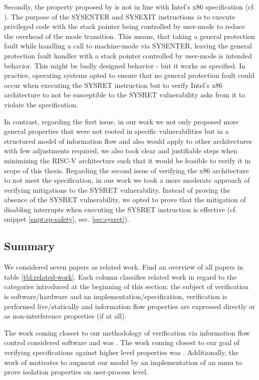 Secondly, the property proposed by \citeauthor{BradfieldS16} is not in line with Intel's x86 specification (cf. \cite{Dunlap19}).
The purpose of the SYSENTER and SYSEXIT instructions \textit{is} to execute privileged code with the stack pointer being controlled by user-mode to reduce the overhead of the mode transition.
This means, that taking a general protection fault while handling a call to machine-mode via SYSENTER, leaving the general protection fault handler with a stack pointer controlled by user-mode is intended behavior.
This might be badly designed behavior - but it works as specified.
In practice, operating systems opted to ensure that no general protection fault could occur when executing the SYSRET instruction but to verify Intel's x86 architecture to not be susceptible to the SYSRET vulnerability asks from it to violate the specification.

In contrast, regarding the first issue, in our work we not only proposed more general properties that were not rooted in specific vulnerabilities but in a structured model of information flow and also would apply to other architectures with few adjustments required, we also took clear and justifiable steps when minimizing the RISC-V architecture such that it would be feasible to verify it in scope of this thesis.
Regarding the second issue of verifying the x86 architecture to not meet the specification, in our work we took a more moderate approach of verifying mitigations to the SYSRET vulnerability.
Instead of proving the absence of the SYSRET vulnerability, we opted to prove that the mitigation of disabling interrupts when executing the SYSRET instruction is effective (cf. snippet \ref{snpt:sp-safety}, sec. \ref{sec:sysret}).

\subsection{Summary}

We considered seven papers as related work.
Find an overview of all papers in table \ref{tbl:related-work}.
Each column classifies related work in regard to the categories introduced at the beginning of this section: the subject of verification is software/hardware and an implementation/specification, verification is performed live/statically and information flow properties are expressed directly or as non-interference properties (if at all).

The work coming closest to our methodology of verification via information flow control considered software and was \cite{GordonKPGNR15,SuhLZD04}.
The work coming closest to our goal of verifying specifications against higher level properties was \cite{Fox02,KhakpourSD13,BradfieldS16}.
Additionally, the work of \cite{SuhLZD04,KhakpourSD13} motivates to augment our model by an implementation of an \gls{mmu} to prove isolation properties on user-process level.

